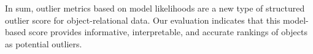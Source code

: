 																
																In sum, outlier metrics based on model likelihoods are a new type of structured outlier score for object-relational data.  Our evaluation indicates that this model-based score provides informative, interpretable, and accurate rankings of objects as potential outliers. 